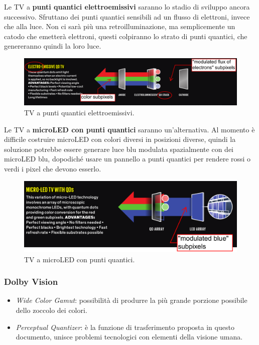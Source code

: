 \documentclass[a4paper,11pt]{article}
\begin{document}
Le TV a \textbf{punti quantici elettroemissivi} saranno lo stadio di sviluppo ancora successivo. Sfruttano dei punti quantici
sensibili ad un flusso di elettroni, invece che alla luce. Non ci sarà più una retroilluminazione, ma semplicemente un catodo
che emetterà elettroni, questi colpiranno lo strato di punti quantici, che genereranno quindi la loro luce.

\renewcommand{\thefigure}{4.21}
\begin{figure}[!h]
  \centering
    \includegraphics[scale=0.25]{images/4/tv_ee_qd.png}
    \caption{TV a punti quantici elettroemissivi.}
\end{figure}

Le TV a \textbf{microLED con punti quantici} saranno un'alternativa. Al momento è difficile costruire microLED con colori diversi
in posizioni diverse, quindi la soluzione potrebbe essere generare luce blu modulata spazialmente con dei microLED blu, dopodiché
usare un pannello a punti quantici per rendere rossi o verdi i pixel che devono esserlo.

\renewcommand{\thefigure}{4.21}
\begin{figure}[!h]
  \centering
    \includegraphics[scale=0.3]{images/4/tv_uled_qd.png}
    \caption{TV a microLED con punti quantici.}
\end{figure}

\subsubsection{Dolby Vision}
\begin{itemize}
    \item \textit{Wide Color Gamut}: possibilità di produrre la più grande porzione possibile dello zoccolo dei colori.
    \item \textit{Perceptual Quantizer}: è la funzione di trasferimento proposta in questo documento, unisce problemi tecnologici con elementi della visione umana.
\end{itemize}
\end{document}

